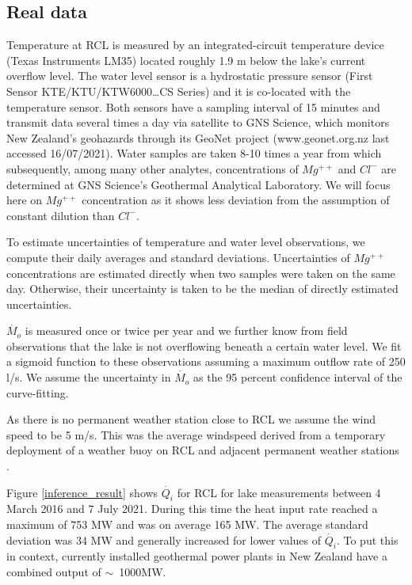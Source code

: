 \documentclass{bmc_template/bmcart}
\begin{document}
\subsection{Real data}\label{realdata}
Temperature at RCL is measured by an integrated-circuit temperature device
(Texas Instruments LM35) located roughly 1.9 m below the lake's current
overflow level. The water level sensor is a hydrostatic pressure sensor (First
Sensor KTE/KTU/KTW6000\ldots CS Series) and it is co-located with the
temperature sensor. Both sensors have a sampling interval of 15 minutes and
transmit data several times a day via satellite to GNS Science, which monitors
New Zealand's geohazards through its GeoNet project (www.geonet.org.nz
 last accessed 16/07/2021).
Water samples are taken 8-10 times a year from which subsequently, among many
other analytes, concentrations of $Mg^{++}$ and $Cl^-$ are determined at GNS
Science's Geothermal Analytical Laboratory. We will focus here on $Mg^{++}$
concentration as it shows less deviation from the assumption of constant
dilution than $Cl^-$.
 
To estimate uncertainties of temperature and water level observations, we 
compute their daily averages and standard deviations. Uncertainties of $Mg^{++}$
concentrations are estimated directly when two samples were taken on the same day.
Otherwise, their uncertainty is taken to be the median of directly estimated
uncertainties. 

$\dot{M_o}$ is measured once or twice per year and we further know from field
observations that the lake is not overflowing beneath a certain water level. We
fit a sigmoid function to these observations assuming a maximum outflow rate of
250 l/s. We assume the uncertainty in $\dot{M_o}$ as the 95 percent confidence
interval of the curve-fitting.

As there is no permanent weather station close to RCL we assume the wind speed
to be 5 m/s. This was the average windspeed derived from a temporary deployment
of a weather buoy on RCL and adjacent permanent weather stations
\cite{hurstUseWeatherBuoy2012}.

Figure \ref{inference_result} shows $\dot{Q_i}$ for RCL for lake measurements
between 4 March 2016 and 7 July 2021. During this time the heat input rate
reached a maximum of 753 MW and was on average 165 MW. The average standard
deviation was 34 MW and generally increased for lower values of $\dot{Q_i}$. To
put this in context, currently installed geothermal power plants in New Zealand
have a combined output of $\sim$~1000MW.
\end{document}
